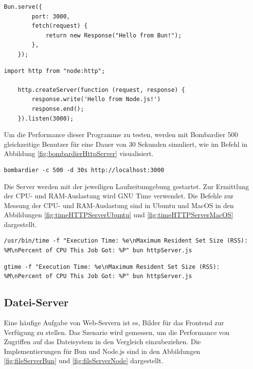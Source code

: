 \begin{lstlisting}[caption={HTTP-Server Bun},label={fig:httpServerBun}]
	Bun.serve({
		port: 3000,
		fetch(request) {
			return new Response("Hello from Bun!");
		},
	});
\end{lstlisting}

\begin{lstlisting}[caption={HTTP-Server Node.js},label={fig:httpServerNode}]
	import http from "node:http";
	
	http.createServer(function (request, response) {
		response.write('Hello from Node.js!')
		response.end();
	}).listen(3000);
\end{lstlisting}

\noindent
Um die Performance dieser Programme zu testen, werden mit Bombardier 500 gleichzeitige Benutzer für eine Dauer von 30 Sekunden simuliert, wie im Befehl in Abbildung \ref{fig:bombardierHttpServer} visualisiert.
\begin{lstlisting}[caption={Bombardier HTTP-Server},label={fig:bombardierHttpServer}]
	bombardier -c 500 -d 30s http://localhost:3000
\end{lstlisting}

\noindent
Die Server werden mit der jeweiligen Laufzeitumgebung gestartet. Zur Ermittlung der CPU- und RAM-Auslastung wird GNU Time verwendet. Die Befehle zur Messung der CPU- und RAM-Auslastung sind in Ubuntu und MacOS in den Abbildungen \ref{fig:timeHTTPServerUbuntu} und \ref{fig:timeHTTPServerMacOS} dargestellt.

\begin{lstlisting}[caption={CPU- und RAM-Messung auf Ubuntu},label={fig:timeHTTPServerUbuntu}]
	/usr/bin/time -f "Execution Time: %e\nMaximum Resident Set Size (RSS): %M\nPercent of CPU This Job Got: %P" bun httpServer.js
\end{lstlisting}

\begin{lstlisting}[caption={CPU- und RAM-Messung auf MacOS},label={fig:timeHTTPServerMacOS}]
	gtime -f "Execution Time: %e\nMaximum Resident Set Size (RSS): %M\nPercent of CPU This Job Got: %P" bun httpServer.js
\end{lstlisting}

\subsection{Datei-Server} \label{subsec:fileServer}
Eine häufige Aufgabe von Web-Servern ist es, Bilder für das Frontend zur Verfügung zu stellen. Das Szenario wird gemessen, um die Performance von Zugriffen auf das Dateisystem in den Vergleich einzubeziehen. \newline
Die Implementierungen für Bun und Node.js sind in den Abbildungen \ref{fig:fileServerBun} und \ref{fig:fileServerNode} dargestellt.

